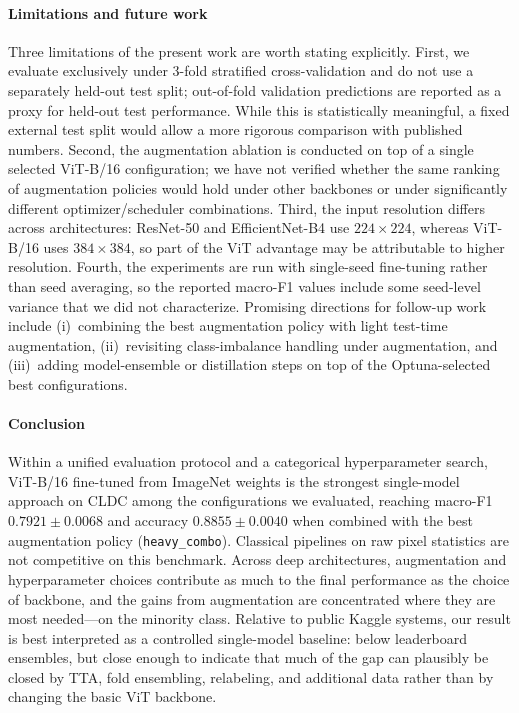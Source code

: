 \documentclass[conference]{IEEEtran}
\begin{document}
\paragraph{Limitations and future work}
Three limitations of the present work are worth stating explicitly. First, we evaluate exclusively under 3-fold stratified cross-validation and do not use a separately held-out test split; out-of-fold validation predictions are reported as a proxy for held-out test performance. While this is statistically meaningful, a fixed external test split would allow a more rigorous comparison with published numbers. Second, the augmentation ablation is conducted on top of a single selected ViT-B/16 configuration; we have not verified whether the same ranking of augmentation policies would hold under other backbones or under significantly different optimizer/scheduler combinations. Third, the input resolution differs across architectures: ResNet-50 and EfficientNet-B4 use $224{\times}224$, whereas ViT-B/16 uses $384{\times}384$, so part of the ViT advantage may be attributable to higher resolution. Fourth, the experiments are run with single-seed fine-tuning rather than seed averaging, so the reported macro-F1 values include some seed-level variance that we did not characterize. Promising directions for follow-up work include (i)~combining the best augmentation policy with light test-time augmentation, (ii)~revisiting class-imbalance handling under augmentation, and (iii)~adding model-ensemble or distillation steps on top of the Optuna-selected best configurations.

\paragraph{Conclusion}
Within a unified evaluation protocol and a categorical hyperparameter search, ViT-B/16 fine-tuned from ImageNet weights is the strongest single-model approach on CLDC among the configurations we evaluated, reaching macro-F1 $0.7921 \pm 0.0068$ and accuracy $0.8855 \pm 0.0040$ when combined with the best augmentation policy (\texttt{heavy\_combo}). Classical pipelines on raw pixel statistics are not competitive on this benchmark. Across deep architectures, augmentation and hyperparameter choices contribute as much to the final performance as the choice of backbone, and the gains from augmentation are concentrated where they are most needed---on the minority class. Relative to public Kaggle systems, our result is best interpreted as a controlled single-model baseline: below leaderboard ensembles, but close enough to indicate that much of the gap can plausibly be closed by TTA, fold ensembling, relabeling, and additional data rather than by changing the basic ViT backbone.



\end{document}
